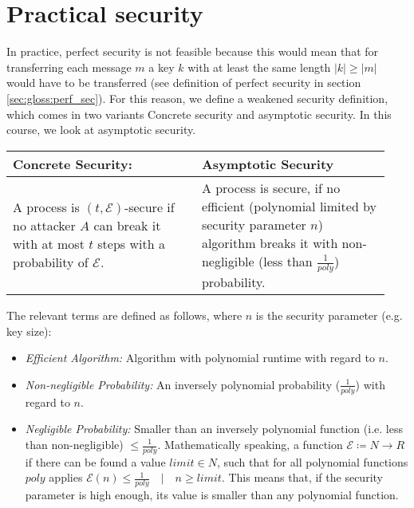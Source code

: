 \section{Practical security}

In practice, perfect security is not feasible because this would mean that for transferring each message $m$ a key $k$ with at least the same length $|k| \geq |m|$ would have to be transferred (see definition of perfect security in section \ref{sec:gloss:perf_sec}). For this reason, we define a weakened security definition, which comes in two variants \textendash{} Concrete security and asymptotic security. In this course, we look at asymptotic security.

\begin{tabular}{|p{0.47\linewidth}|p{0.47\linewidth}|}
    \hline
    \textbf{Concrete Security:}                                                                                                       & \textbf{Asymptotic Security}                                                                                                                                          \\
    \hline
    A process is $(t,\mathcal{E})$-secure if no attacker $A$ can break it with at most $t$ steps with a probability of $\mathcal{E}$. & A process is secure, if no efficient (polynomial limited by security parameter $n$) algorithm breaks it with non-negligible (less than $\frac{1}{poly}$) probability. \\
    \hline
\end{tabular}

The relevant terms are defined as follows, where $n$ is the security parameter (e.g. key size):

\begin{itemize}
    \item \textit{Efficient Algorithm:} Algorithm with polynomial runtime with regard to $n$.
    \item \textit{Non-negligible Probability:} An inversely polynomial probability ($\frac{1}{poly}$) with regard to $n$.
    \item \textit{Negligible Probability:} Smaller than an inversely polynomial function (i.e. less than non-negligible) $\leq \frac{1}{poly}$. Mathematically speaking, a function $\mathcal{E} \coloneqq N \rightarrow R$ if there can be found a value $limit \in N$, such that for all polynomial functions $poly$ applies $\mathcal{E}(n) \leq \frac{1}{poly} \quad|\quad n \ge limit$. This means that, if the security parameter is high enough, its value is smaller than any polynomial function.
\end{itemize}

